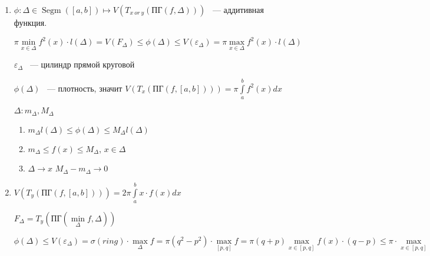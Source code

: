 \documentclass[../main.tex]{subfiles}
\begin{document}
            \begin{enumerate}
            
                \item
                
                $\phi: \Delta \in \operatorname{Segm}([a, b]) \mapsto V(T_{x \ or \ y} (\text{ПГ}(f, \Delta)))$ ~--- аддитивная функция.
            
                $\pi \min\limits_{x \in \Delta} f^2(x) \cdot l(\Delta) = V(F_{\Delta}) \leq \phi(\Delta) \leq V(\varepsilon_{\Delta}) = \pi \max\limits_{x \in \Delta} f^2(x) \cdot l(\Delta)$
            
                $\varepsilon_{\Delta}$ ~--- цилиндр прямой круговой
            
                $\phi(\Delta)$ ~--- плотность, значит $V(T_x(\text{ПГ}(f, [a, b]))) = \pi \int\limits^b_a f^2(x) dx$
            
                $\Delta : m_{\Delta}, M_{\Delta}$
            
                \begin{enumerate}
            
                    \item $m_{\Delta} l(\Delta) \leq \phi(\Delta) \leq M_{\Delta} l(\Delta)$
                
                    \item $m_{\Delta} \leq f(x) \leq M_{\Delta}$, $x \in \Delta$
                
                    \item $\Delta \rightarrow x$ $M_{\Delta} - m_{\Delta} \rightarrow 0$
                
                \end{enumerate}
            
                \item
                
                $V(T_y(\text{ПГ}(f, [a, b]))) = 2 \pi \int\limits^b_a x \cdot f(x) dx$
            
                $F_{\Delta} = T_y(\text{ПГ}(\min\limits_{\Delta} f, \Delta))$
            
                $\phi(\Delta) \leq V(\varepsilon_{\Delta}) = \sigma(ring) \cdot \max\limits_{\Delta} f = \pi(q^2 - p^2) \cdot \max\limits_{[p, q]} f = \pi (q + p) \max\limits_{x \in [p, q]} f(x) \cdot (q - p) \leq \pi \cdot \max\limits_{x \in [p, q]} (2x) \cdot \max\limits_{x \in [p, q]} f(x) \cdot (q - p)$
            

\end{enumerate}
\end{document}
